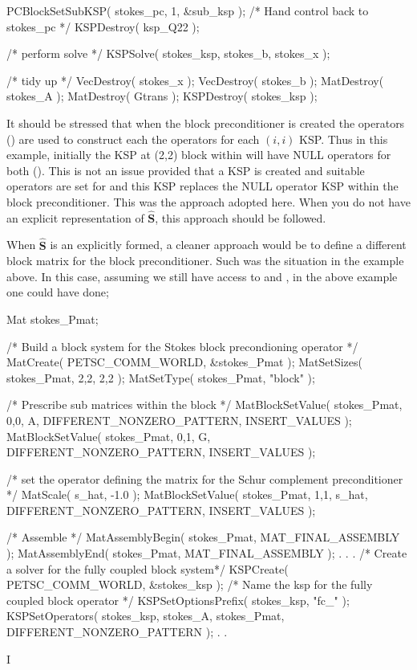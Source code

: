 \documentclass[10pt,a4paper]{amsart}
\newcommand{\m}[1]{\boldsymbol{#1}}		%
\newcommand{\code}[1]{{\fontfamily{txtt}\selectfont {#1}}}
\newcommand{\diag}[1]{\mbox{diag}\left({#1}\right)}
\begin{document}
\begin{verbatimtab}[4]
	PCBlockSetSubKSP( stokes_pc, 1, &sub_ksp );	
	/* Hand control back to stokes_pc */
	KSPDestroy( ksp_Q22 );  

	/* perform solve */
	KSPSolve( stokes_ksp, stokes_b, stokes_x );

	/* tidy up */
	VecDestroy( stokes_x );
	VecDestroy( stokes_b );
	MatDestroy( stokes_A );
	MatDestroy( Gtrans );
	KSPDestroy( stokes_ksp );
\end{verbatimtab}

It should be stressed that when the block preconditioner is created the operators (\code{Amat,Pmat}) are used to construct each the operators for each $(i,i)$ KSP. Thus in this example, initially the KSP at (2,2) block within \code{stokes\_pc} will have NULL operators for both (\code{Amat,Pmat}). This is not an issue provided that a KSP is created and  suitable operators are set for \code{Amat,Pmat} and this KSP replaces the NULL operator KSP within the block preconditioner. This was the approach adopted here. 
When you do not have an explicit representation of $\hat{\m S}$, this approach should be followed.

When $\hat{\m S}$ is an explicitly formed,  a cleaner approach would be to define a different block matrix for the block preconditioner. Such was the situation in the example above. In this case, assuming we still have access to \code{s\_hat} and \code{G}, in the above example one could have done;
\begin{verbatimtab}[4]
	Mat stokes_Pmat;

	/* Build a block system for the Stokes block precondioning operator */	
	MatCreate( PETSC_COMM_WORLD, &stokes_Pmat );
	MatSetSizes( stokes_Pmat, 2,2, 2,2 );
	MatSetType( stokes_Pmat, "block" );

	/* Prescribe sub matrices within the block */
	MatBlockSetValue( stokes_Pmat, 0,0, A,  DIFFERENT_NONZERO_PATTERN, INSERT_VALUES );
	MatBlockSetValue( stokes_Pmat, 0,1, G,  DIFFERENT_NONZERO_PATTERN, INSERT_VALUES );

	/* set the operator defining the matrix for the Schur complement preconditioner */
	MatScale( s_hat, -1.0 );
	MatBlockSetValue( stokes_Pmat, 1,1, s_hat, DIFFERENT_NONZERO_PATTERN, INSERT_VALUES );

	/* Assemble */
	MatAssemblyBegin( stokes_Pmat, MAT_FINAL_ASSEMBLY );
	MatAssemblyEnd( stokes_Pmat, MAT_FINAL_ASSEMBLY );
	.
	.
	.
	/* Create a solver for the fully coupled block system*/
	KSPCreate( PETSC_COMM_WORLD, &stokes_ksp );
	/* Name the ksp for the fully coupled block operator */
	KSPSetOptionsPrefix( stokes_ksp, "fc_" );  
	KSPSetOperators( stokes_ksp, stokes_A, stokes_Pmat, DIFFERENT_NONZERO_PATTERN );
	.
	.
\end{verbatimtab}
I



%





\end{document}
